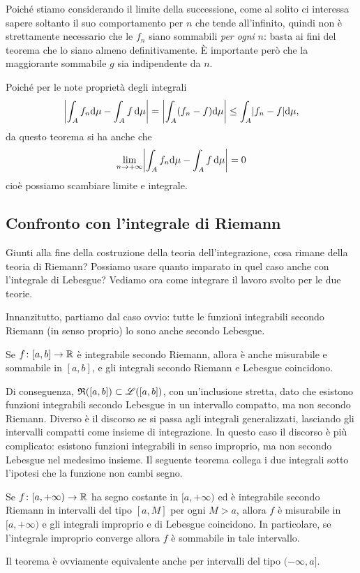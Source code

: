 Poich\'e stiamo considerando il limite della successione, come al solito ci interessa sapere soltanto il suo comportamento per $n$ che tende all'infinito, quindi non è strettamente necessario che le $f_n$ siano sommabili \emph{per ogni} $n$: basta ai fini del teorema che lo siano almeno definitivamente.
È importante però che la maggiorante sommabile $g$ sia indipendente da $n$.
\begin{osservazione} \label{o:convergenza-dominata}
	Poich\'e per le note proprietà degli integrali
	\begin{equation*}
		\abs[\bigg]{\int_Af_n\dd\mu-\int_Af\,\dd\mu}=\abs[\bigg]{\int_A(f_n-f)\dd\mu}\leq\int_A\abs{f_n-f}\dd\mu,
	\end{equation*}
	da questo teorema si ha anche che
	\begin{equation}
		\lim_{n\to+\infty}\abs[\bigg]{\int_Af_n\dd\mu-\int_Af\,\dd\mu}=0
	\end{equation}
	cioè possiamo scambiare limite e integrale.
\end{osservazione}

\subsection*{Confronto con l'integrale di Riemann}
Giunti alla fine della costruzione della teoria dell'integrazione, cosa rimane della teoria di Riemann?
Possiamo usare quanto imparato in quel caso anche con l'integrale di Lebesgue?
Vediamo ora come integrare il lavoro svolto per le due teorie. %

Innanzitutto, partiamo dal caso ovvio: tutte le funzioni integrabili secondo Riemann (in senso proprio) lo sono anche secondo Lebesgue.
\begin{teorema} \label{t:integrale-riemann-lebesgue}
	Se $f\colon[a,b]\to\R$ è integrabile secondo Riemann, allora è anche misurabile e sommabile in $[a,b]$, e gli integrali secondo Riemann e Lebesgue coincidono.
\end{teorema}
Di conseguenza, $\rie{[a,b]}\subset\summ{[a,b]}$, con un'inclusione stretta, dato che esistono funzioni integrabili secondo Lebesgue in un intervallo compatto, ma non secondo Riemann.
Diverso è il discorso se si passa agli integrali generalizzati, lasciando gli intervalli compatti come insieme di integrazione.
In questo caso il discorso è più complicato: esistono funzioni integrabili in senso improprio, ma non secondo Lebesgue nel medesimo insieme.
Il seguente teorema collega i due integrali sotto l'ipotesi che la funzione non cambi segno.
\begin{teorema} \label{t:integrale-improprio-lebesgue}
	Se $f\colon[a,+\infty)\to\R$ ha segno costante in $[a,+\infty)$ ed è integrabile secondo Riemann in intervalli del tipo $[a,M]$ per ogni $M>a$, allora $f$ è misurabile in $[a,+\infty)$ e gli integrali improprio e di Lebesgue coincidono.
	In particolare, se l'integrale improprio converge allora $f$ è sommabile in tale intervallo.
\end{teorema}
Il teorema è ovviamente equivalente anche per intervalli del tipo $(-\infty,a]$.

